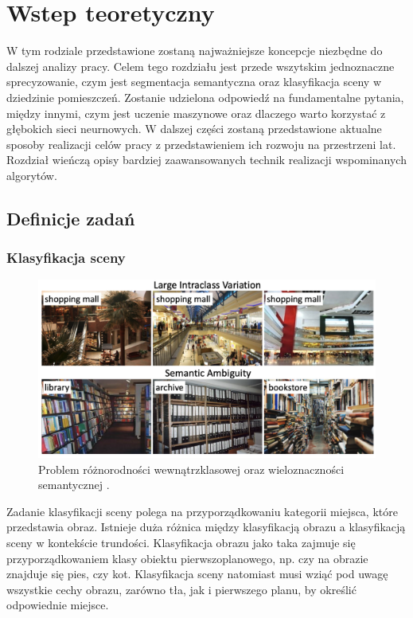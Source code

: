 \newpage %
\section{Wstep teoretyczny}
W tym rodziale przedstawione zostaną najważniejsze koncepcje niezbędne do dalszej analizy pracy. Celem tego rozdziału jest przede wszytskim jednoznaczne sprecyzowanie, czym jest segmentacja semantyczna oraz klasyfikacja sceny w dziedzinie pomieszczeń. Zostanie udzielona odpowiedź na fundamentalne pytania, między innymi, czym jest uczenie maszynowe oraz dlaczego warto korzystać z głębokich sieci neurnowych. W dalszej części zostaną przedstawione aktualne sposoby realizacji celów pracy z przedstawieniem ich rozwoju na przestrzeni lat. Rozdział wieńczą opisy bardziej zaawansowanych technik realizacji wspominanych algorytów.
\subsection{Definicje zadań}
\subsubsection{Klasyfikacja sceny}
\begin{figure}[ht!]
    \includegraphics[width=\textwidth]{img/scene_class.png}
    \caption{Problem różnorodności wewnątrzklasowej oraz wieloznaczności semantycznej \cite{zeng2021deep}.}
    \label{fig:scene-class}
\end{figure}

Zadanie klasyfikacji sceny polega na przyporządkowaniu kategorii miejsca, które przedstawia obraz. Istnieje duża różnica między klasyfikacją obrazu a klasyfikacją sceny w kontekście trundości. Klasyfikacja obrazu jako taka zajmuje się przyporządkowaniem klasy obiektu pierwszoplanowego, np. czy na obrazie znajduje się pies, czy kot. Klasyfikacja sceny natomiast musi wziąć pod uwagę wszystkie cechy obrazu, zarówno tła, jak i pierwszego planu, by określić odpowiednie miejsce. 


